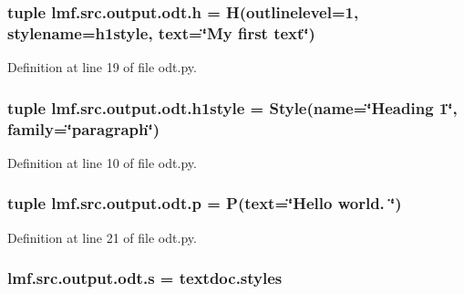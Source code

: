 \hypertarget{namespacelmf_1_1src_1_1output_1_1odt_a1a55a65013697849c387fde9a56b25ca}{
\subsubsection[{h}]{\setlength{\rightskip}{0pt plus 5cm}tuple lmf.\+src.\+output.\+odt.\+h = H(outlinelevel=1, stylename={\bf h1style}, text=\char`\"{}My first text\char`\"{})}}\label{namespacelmf_1_1src_1_1output_1_1odt_a1a55a65013697849c387fde9a56b25ca}


Definition at line 19 of file odt.\+py.

\hypertarget{namespacelmf_1_1src_1_1output_1_1odt_a42dc5d526d0fc00bb6d63fa261a316d3}{
\subsubsection[{h1style}]{\setlength{\rightskip}{0pt plus 5cm}tuple lmf.\+src.\+output.\+odt.\+h1style = Style(name=\char`\"{}Heading 1\char`\"{}, family=\char`\"{}paragraph\char`\"{})}}\label{namespacelmf_1_1src_1_1output_1_1odt_a42dc5d526d0fc00bb6d63fa261a316d3}


Definition at line 10 of file odt.\+py.

\hypertarget{namespacelmf_1_1src_1_1output_1_1odt_afa1b5866aef132001690773cb7a63798}{
\subsubsection[{p}]{\setlength{\rightskip}{0pt plus 5cm}tuple lmf.\+src.\+output.\+odt.\+p = P(text=\char`\"{}Hello world. \char`\"{})}}\label{namespacelmf_1_1src_1_1output_1_1odt_afa1b5866aef132001690773cb7a63798}


Definition at line 21 of file odt.\+py.

\hypertarget{namespacelmf_1_1src_1_1output_1_1odt_a5de2fbc8864cd6875671cf45d669877a}{
\subsubsection[{s}]{\setlength{\rightskip}{0pt plus 5cm}lmf.\+src.\+output.\+odt.\+s = textdoc.\+styles}}\label{namespacelmf_1_1src_1_1output_1_1odt_a5de2fbc8864cd6875671cf45d669877a}


